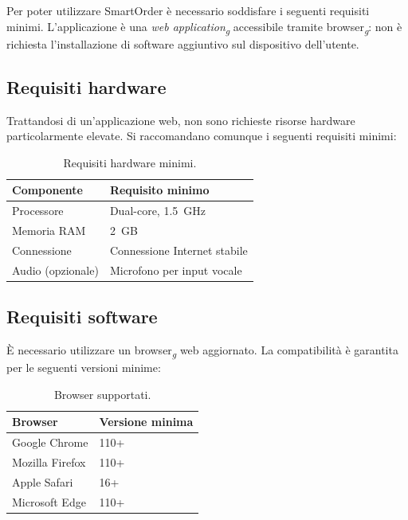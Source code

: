 Per poter utilizzare SmartOrder \`e necessario soddisfare i seguenti requisiti minimi. L'applicazione \`e una \textit{web application}\textsubscript{\textit{g}} accessibile tramite browser\textsubscript{\textit{g}}: non \`e richiesta l'installazione di software aggiuntivo sul dispositivo dell'utente.

\subsection{Requisiti hardware}
Trattandosi di un'applicazione web, non sono richieste risorse hardware particolarmente elevate. Si raccomandano comunque i seguenti requisiti minimi:

\begin{table}[H]
    \centering
    \renewcommand{\arraystretch}{1.2}
    \begin{tabular}{ll}
        \toprule
        \textbf{Componente} & \textbf{Requisito minimo} \\
        \midrule
        Processore  & Dual-core, 1.5~GHz \\
        Memoria RAM & 2~GB \\
        Connessione & Connessione Internet stabile \\
        Audio (opzionale) & Microfono per input vocale \\
        \bottomrule
    \end{tabular}
    \caption{Requisiti hardware minimi.}
    \label{tab:req-hw}
\end{table}

\subsection{Requisiti software}
\`E necessario utilizzare un browser\textsubscript{\textit{g}} web aggiornato. La compatibilit\`a \`e garantita per le seguenti versioni minime:

\begin{table}[H]
    \centering
    \renewcommand{\arraystretch}{1.2}
    \begin{tabular}{ll}
        \toprule
        \textbf{Browser} & \textbf{Versione minima} \\
        \midrule
        Google Chrome   & 110+ \\
        Mozilla Firefox & 110+ \\
        Apple Safari    & 16+ \\
        Microsoft Edge  & 110+ \\
        \bottomrule
    \end{tabular}
    \caption{Browser supportati.}
    \label{tab:req-browser}
\end{table}

